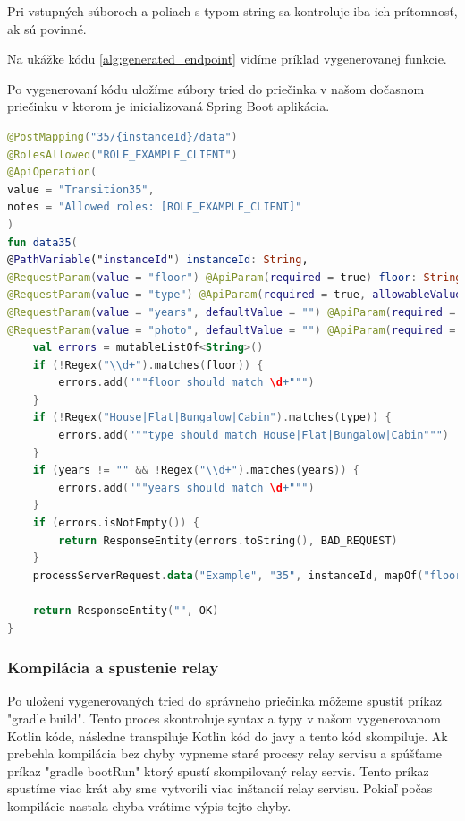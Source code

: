 Pri vstupných súboroch a poliach s typom string sa kontroluje iba ich prítomnosť, ak sú povinné. 

Na ukážke kódu \ref{alg:generated_endpoint} vidíme príklad vygenerovanej funkcie. 

Po vygenerovaní kódu uložíme súbory tried do priečinka v našom dočasnom priečinku v ktorom je inicializovaná Spring Boot aplikácia.   

\begin{lstlisting}[float, caption={Príklad vygenerovanej funkcie},label={alg:generated_endpoint},language=Kotlin] 
@PostMapping("35/{instanceId}/data") 
@RolesAllowed("ROLE_EXAMPLE_CLIENT") 
@ApiOperation( 
value = "Transition35", 
notes = "Allowed roles: [ROLE_EXAMPLE_CLIENT]" 
) 
fun data35( 
@PathVariable("instanceId") instanceId: String, 
@RequestParam(value = "floor") @ApiParam(required = true) floor: String, 
@RequestParam(value = "type") @ApiParam(required = true, allowableValues = """[House, Flat, Bungalow, Cabin]""") type: String, 
@RequestParam(value = "years", defaultValue = "") @ApiParam(required = false) years: String, 
@RequestParam(value = "photo", defaultValue = "") @ApiParam(required = false) photo: MultipartFile ): ResponseEntity<String> { 
	val errors = mutableListOf<String>() 
	if (!Regex("\\d+").matches(floor)) { 
		errors.add("""floor should match \d+""") 
	} 
	if (!Regex("House|Flat|Bungalow|Cabin").matches(type)) { 
		errors.add("""type should match House|Flat|Bungalow|Cabin""") 
	}
	if (years != "" && !Regex("\\d+").matches(years)) { 
		errors.add("""years should match \d+""") 
	} 
	if (errors.isNotEmpty()) { 
		return ResponseEntity(errors.toString(), BAD_REQUEST) 
	} 
	processServerRequest.data("Example", "35", instanceId, mapOf("floor" to floor, "type" to type, "years" to years, "photo" to photo )) 
	
	return ResponseEntity("", OK) 
} 
\end{lstlisting} 

\subsubsection{Kompilácia a spustenie relay} 

Po uložení vygenerovaných tried do správneho priečinka môžeme spustiť príkaz "gradle build". Tento proces skontroluje syntax a typy v našom vygenerovanom Kotlin kóde, následne transpiluje Kotlin kód do javy a tento kód skompiluje. Ak prebehla kompilácia bez chyby vypneme staré procesy relay servisu a spúšťame príkaz "gradle bootRun" ktorý spustí skompilovaný relay servis. Tento príkaz spustíme viac krát aby sme vytvorili viac inštancií relay servisu. Pokiaľ počas kompilácie nastala chyba vrátime výpis tejto chyby.  



